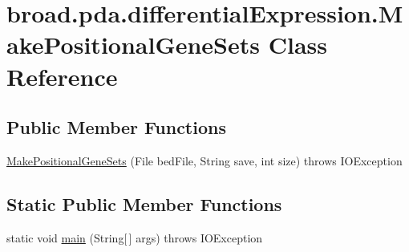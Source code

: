 \hypertarget{classbroad_1_1pda_1_1differential_expression_1_1_make_positional_gene_sets}{\section{broad.\+pda.\+differential\+Expression.\+Make\+Positional\+Gene\+Sets Class Reference}
\label{classbroad_1_1pda_1_1differential_expression_1_1_make_positional_gene_sets}
}
\subsection*{Public Member Functions}
\begin{DoxyCompactItemize}
\item 
\hyperlink{classbroad_1_1pda_1_1differential_expression_1_1_make_positional_gene_sets_aed4e8326f4513fb713f691b22a0fcefd}{Make\+Positional\+Gene\+Sets} (File bed\+File, String save, int size)  throws I\+O\+Exception
\end{DoxyCompactItemize}
\subsection*{Static Public Member Functions}
\begin{DoxyCompactItemize}
\item 
static void \hyperlink{classbroad_1_1pda_1_1differential_expression_1_1_make_positional_gene_sets_aff9e7f8580c2c6201db83112380d40ad}{main} (String\mbox{[}$\,$\mbox{]} args)  throws I\+O\+Exception
\end{DoxyCompactItemize}


